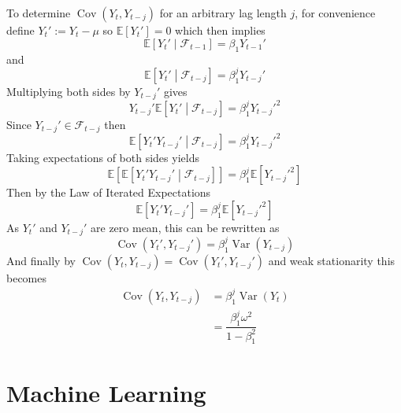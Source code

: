 \documentclass[11pt]{report} %
\begin{document}
To determine $\operatorname{Cov}\left(Y_{t}, Y_{t - j}\right)$ for an arbitrary lag length $j$, for convenience define $Y_{t}' := Y_{t} - \mu$ so $\mathbb{E}\left[Y_{t}'\right] = 0$ which then implies
\begin{equation}
\mathbb{E}\left[Y_{t}'\middle|\mathcal{F}_{t-1}\right] = \beta_{1}Y_{t - 1}'
\end{equation}
and
\begin{equation}
\mathbb{E}\left[Y_{t}'\middle|\mathcal{F}_{t-j}\right] = \beta_{1}^{j}Y_{t - j}'
\end{equation}
Multiplying both sides by $Y_{t - j}'$ gives
\begin{equation}
Y_{t - j}'\mathbb{E}\left[Y_{t}'\middle|\mathcal{F}_{t-j}\right] = \beta_{1}^{j}Y_{t - j}'^{2}
\end{equation}
Since $Y_{t - j}' \in \mathcal{F}_{t- j}$ then
\begin{equation}
\mathbb{E}\left[Y_{t}'Y_{t - j}'\middle|\mathcal{F}_{t-j}\right] = \beta_{1}^{j}Y_{t - j}'^{2}
\end{equation}
Taking expectations of both sides yields
\begin{equation}
\mathbb{E}\left[\mathbb{E}\left[Y_{t}'Y_{t - j}'\middle|\mathcal{F}_{t-j}\right]\right] = \beta_{1}^{j}\mathbb{E}\left[Y_{t - j}'^{2}\right]
\end{equation}
Then by the Law of Iterated Expectations
\begin{equation}
\mathbb{E}\left[Y_{t}'Y_{t - j}'\right] = \beta_{1}^{j}\mathbb{E}\left[Y_{t - j}'^{2}\right]
\end{equation}
As $Y_{t}'$ and $Y_{t - j}'$ are zero mean, this can be rewritten as
\begin{equation}
\operatorname{Cov}\left(Y_{t}', Y_{t - j}'\right) = \beta_{1}^{j}\operatorname{Var}\left(Y_{t - j}\right)
\end{equation}
And finally by $\operatorname{Cov}\left(Y_{t}, Y_{t - j}\right) = \operatorname{Cov}\left(Y_{t}', Y_{t - j}'\right)$ and weak stationarity this becomes
\begin{align}
\operatorname{Cov}\left(Y_{t}, Y_{t - j}\right) &= \beta_{1}^{j}\operatorname{Var}\left(Y_{t}\right) \\
&= \dfrac{\beta_{1}^{j}\omega^{2}}{1 - \beta_{1}^{2}}
\end{align}

\chapter{Machine Learning}
\end{document}

